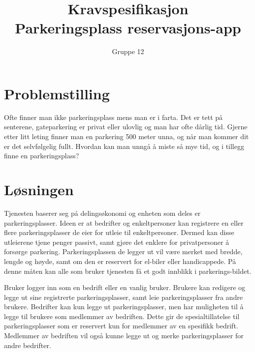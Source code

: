 \documentclass[12pt]{article}
\begin{document}
\title{%
    Kravspesifikasjon\\
    \large Parkeringsplass reservasjons-app }
\author{Gruppe 12}
\date{}
\maketitle

\newpage

\tableofcontents

\newpage

\section{Problemstilling}

Ofte finner man ikke parkeringsplass mens man er i farta. Det er tett på senterene, gateparkering er privat eller ulovlig og man har ofte dårlig tid. Gjerne etter litt leting finner man en parkering 500 meter unna, og når man kommer dit er det selvfølgelig fullt. Hvordan kan man unngå å miste så mye tid, og i tillegg finne en parkeringsplass?

\section{Løsningen}
Tjenesten baserer seg på delingsøkonomi og enheten som deles er parkeringsplasser. Ideen er at bedrifter og enkeltpersoner kan registrere en eller flere parkeringsplasser de eier for utleie til enkeltpersoner. Dermed kan disse utleierene tjene penger passivt, samt gjøre det enklere for privatpersoner å forsørge parkering. Parkeringsplassen de legger ut vil være merket med bredde, lengde og høyde, samt om den er reservert for el-biler eller handicappede. På denne måten kan alle som bruker tjenesten få et godt innblikk i parkerings-bildet.

Bruker logger inn som en bedrift eller en vanlig bruker. Brukere kan redigere og legge ut sine registrerte parkeringsplasser, samt leie parkeringsplasser fra andre brukere. Bedrifter kan kun legge ut parkeringsplasser, men har muligheten til å legge til brukere som medlemmer av bedriften. Dette gir de spesialtillatelse til parkeringsplasser som er reservert kun for medlemmer av en spesifikk bedrift. Medlemmer av bedriften vil også kunne legge ut og merke parkeringsplasser for andre bedrifter.
\end{document}

